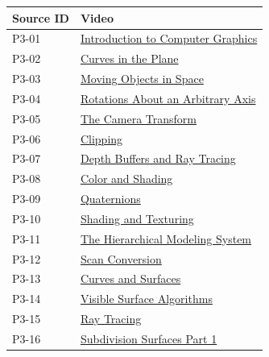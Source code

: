 {\def\LTcaptype{none} %
\begin{longtable}[]{@{}
  >{\raggedright\arraybackslash}p{}
  >{\raggedright\arraybackslash}p{}@{}}
\toprule\noalign{}
\begin{minipage}[b]{\linewidth}\raggedright
Source ID
\end{minipage} & \begin{minipage}[b]{\linewidth}\raggedright
Video
\end{minipage} \\
\midrule\noalign{}
\endhead
\bottomrule\noalign{}
\endlastfoot
P3-01 & \href{https://www.youtube.com/watch?v=01YSK5gIEYQ}{Introduction to Computer Graphics} \\
P3-02 & \href{https://www.youtube.com/watch?v=0NbD-c0Ctdk}{Curves in the Plane} \\
P3-03 & \href{https://www.youtube.com/watch?v=wArGifkRD2A}{Moving Objects in Space} \\
P3-04 & \href{https://www.youtube.com/watch?v=gRVxv8kWl0Q}{Rotations About an Arbitrary Axis} \\
P3-05 & \href{https://www.youtube.com/watch?v=mpTl003EXCY}{The Camera Transform} \\
P3-06 & \href{https://www.youtube.com/watch?v=og7hOFypKpQ}{Clipping} \\
P3-07 & \href{https://www.youtube.com/watch?v=Xks1v4GNUiY}{Depth Buffers and Ray Tracing} \\
P3-08 & \href{https://www.youtube.com/watch?v=TEjDYtkLRdQ}{Color and Shading} \\
P3-09 & \href{https://www.youtube.com/watch?v=mHVwd8gYLnI}{Quaternions} \\
P3-10 & \href{https://www.youtube.com/watch?v=Is6D5rnWEvs}{Shading and Texturing} \\
P3-11 & \href{https://www.youtube.com/watch?v=D8ZYHXom0qk}{The Hierarchical Modeling System} \\
P3-12 & \href{https://www.youtube.com/watch?v=23HEwdcphg4}{Scan Conversion} \\
P3-13 & \href{https://www.youtube.com/watch?v=FTg1DUr7bhY}{Curves and Surfaces} \\
P3-14 & \href{https://www.youtube.com/watch?v=hmlWFi1TdbI}{Visible Surface Algorithms} \\
P3-15 & \href{https://www.youtube.com/watch?v=Ahp6LDQnK4Y}{Ray Tracing} \\
P3-16 & \href{https://www.youtube.com/watch?v=9uscFr2Hht0}{Subdivision Surfaces Part 1} \\

\end{longtable}}
